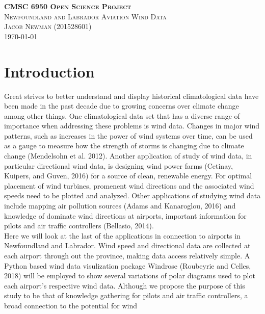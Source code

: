 \documentclass{article}
\begin{document}
\begin{titlepage}
\newcommand{\HRule}{\rule{\linewidth}{0.5mm}}

\center
\textsc{\LARGE \textbf{CMSC 6950 Open Science Project}}\\[1 cm]

\textsc{\Large Newfoundland and Labrador Aviation Wind Data}\\[0.5 cm]

\textsc{\large Jacob Newman (201528601)}\\[0.5 cm]





\vfill\vfill\vfill
{\large\today}
\vfill

\end{titlepage}


\section{Introduction}\label{Introduction}
Great strives to better understand and display historical climatological data have been made in the past decade due to growing concerns over climate change among other things. One climatological data set 
that has a diverse range of importance when addressing these problems is wind data. Changes in major wind patterns, such as increases in the power of wind systems over time, can be used as a gauge to 
measure how the strength of storms is changing due to climate change (Mendelsohn et al. 2012). Another application of study of wind data, in particular directional wind data, is designing wind power 
farms (Cetinay, Kuipers, and Guven, 2016) for a source of clean, renewable energy. For optimal placement of wind turbines, promenent wind directions and the associated wind speeds need to be plotted and 
analyzed. Other applications of studying wind data include mapping air pollution sources (Adams and Kanaroglou, 2016) and knowledge of dominate wind directions at airports, important information for 
pilots and air traffic controllers (Bellasio, 2014).
\\
\indent Here we will look at the last of the applications in connection to airports in Newfoundland and Labrador. Wind speed and directional data are collected at each airport through out the province, 
making data access relatively simple. A Python based wind data visulization package Windrose (Roubeyrie and Celles, 2018) will be employed to show several variations of polar diagrams used to plot each 
airport's respective wind data. Although we propose the purpose of this study to be that of knowledge gathering for pilots and air traffic controllers, a broad connection to the potential for wind 
\end{document}
